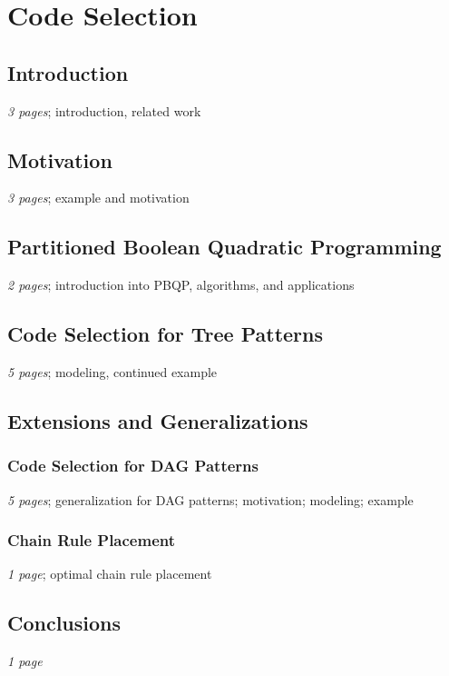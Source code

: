 \applynumberofpages\chapter{Code Selection }

\section{Introduction}
\emph{3 pages}; introduction, related work

\section{Motivation}
\emph{3 pages}; example and motivation

\section{Partitioned Boolean Quadratic Programming}
\emph{2 pages}; introduction into PBQP, algorithms, and applications

\section{Code Selection for Tree Patterns}
\emph{5 pages}; modeling, continued example

\section{Extensions and Generalizations}

\subsection{Code Selection for DAG Patterns} 
\emph{5 pages}; generalization for DAG patterns; motivation; modeling; example

\subsection{Chain Rule Placement}
\emph{1 page}; optimal chain rule placement

\section{Conclusions}
\emph{1 page}
